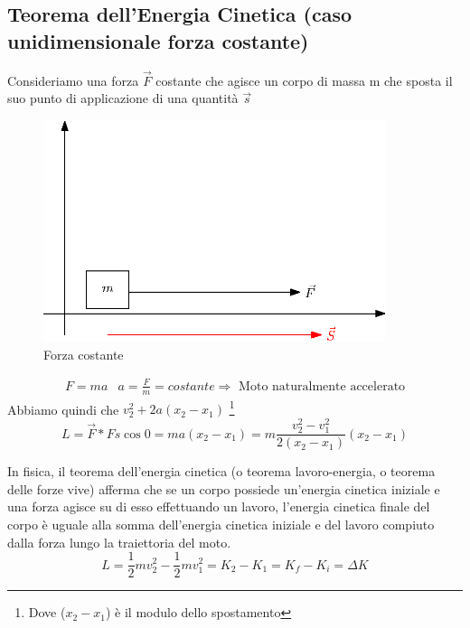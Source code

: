 \subsection{Teorema dell’Energia Cinetica (caso unidimensionale forza costante)}
Consideriamo una forza $\vec{F}$ costante che agisce un corpo di massa m che sposta il suo punto di
applicazione di una quantità $\vec{s}$
\begin{figure}[th]
    \centering
    \includegraphics[width=10cm]{img/finiti/forza_costante.eps}
    \caption{Forza costante}
\end{figure}
\begin{equation}
  \begin{matrix}
    F=ma & a=\frac{F}{m}=costante \Rightarrow \text{ Moto naturalmente accelerato}
  \end{matrix}
\end{equation}
Abbiamo quindi che $v_2^2+2a(x_2-x_1)$ \footnote{Dove ($x_2-x_1$) è il modulo dello spostamento}
\begin{equation}
  L=\vec{F} * Fs \cos 0 = ma (x_2-x_1)=m\frac{v_2^2-v_1^2}{2(x_2-x_1)}(x_2-x_1)
\end{equation}
\begin{teo}
  In fisica, il teorema dell'energia cinetica (o teorema lavoro-energia, o
  teorema delle forze vive) afferma che se un corpo possiede un'energia cinetica iniziale e
  una forza agisce su di esso effettuando un lavoro, l'energia cinetica finale del corpo è
  uguale alla somma dell'energia cinetica iniziale e del lavoro compiuto dalla forza lungo
  la traiettoria del moto.
  \begin{equation}
    L=\frac{1}{2} m v_2^2-\frac{1}{2} m v_1^2=K_2-K_1=K_f-K_i=\Delta K
  \end{equation}
\end{teo}
